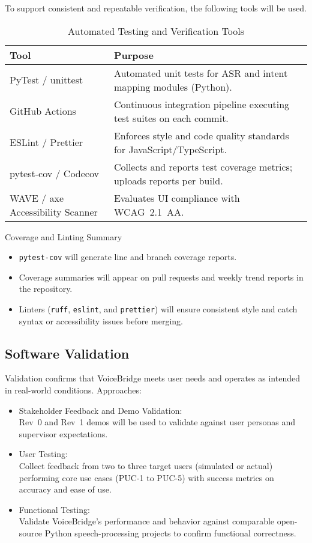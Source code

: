 \documentclass[12pt, titlepage]{article}
\begin{document}
To support consistent and repeatable verification, the following tools will be used.

\begin{table}[H]
\centering
\caption{Automated Testing and Verification Tools}
\renewcommand{\arraystretch}{1.2}
\begin{tabular}{|p{4cm}|p{10cm}|}
\hline
Tool & Purpose \\ \hline
PyTest / unittest & Automated unit tests for ASR and intent mapping modules (Python). \\ \hline
GitHub Actions & Continuous integration pipeline executing test suites on each commit. \\ \hline
ESLint / Prettier & Enforces style and code quality standards for JavaScript/TypeScript. \\ \hline
pytest-cov / Codecov & Collects and reports test coverage metrics; uploads reports per build. \\ \hline
WAVE / axe Accessibility Scanner & Evaluates UI compliance with WCAG~2.1~AA. \\ \hline
\end{tabular}
\end{table}

Coverage and Linting Summary

\begin{itemize}
    \item \texttt{pytest-cov} will generate line and branch coverage reports.
    \item Coverage summaries will appear on pull requests and weekly trend reports in the repository.
    \item Linters (\texttt{ruff}, \texttt{eslint}, and \texttt{prettier}) will ensure consistent style and catch syntax or accessibility issues before merging.
\end{itemize}

\subsection{Software Validation}

Validation confirms that VoiceBridge meets user needs and operates as intended in real-world conditions. Approaches:

\begin{itemize}
    \item Stakeholder Feedback and Demo Validation: \\
    Rev~0 and Rev~1 demos will be used to validate against user personas and supervisor expectations.

    \item User Testing: \\
    Collect feedback from two to three target users (simulated or actual) performing core use cases (PUC-1 to PUC-5) with success metrics on accuracy and ease of use.

    \item Functional Testing: \\
    Validate VoiceBridge’s performance and behavior against comparable open-source Python speech-processing projects to confirm functional correctness.
\end{itemize}
\end{document}
